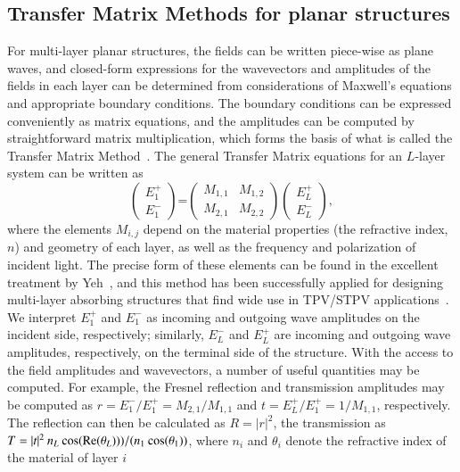 \documentclass[review]{elsarticle}
\begin{document}
\subsection{Transfer Matrix Methods for planar structures}
For multi-layer planar structures, the fields can be written piece-wise as plane waves, and closed-form expressions for the wavevectors
and amplitudes of the fields in each layer can be determined from considerations of Maxwell's equations and appropriate boundary
conditions.  The boundary conditions can be expressed conveniently as matrix equations, and the amplitudes can be computed by
straightforward matrix multiplication, which forms the basis of what is called the Transfer Matrix Method~\cite{Yeh}.  The general
Transfer Matrix equations for an $L$-layer system can be written as
\begin{equation}\label{Fresnel}
  \begin{pmatrix} E_1^+  \\ E_1^-  \end{pmatrix}
  \mbox{=}
  \begin{pmatrix}
  M_{1,1} & M_{1,2} \\
  M_{2,1} & M_{2,2}  \end{pmatrix}
  \begin{pmatrix} E_L^+ \\ E_L^-  \end{pmatrix},
\end{equation}
where the elements $M_{i,j}$ depend on the material properties (the refractive index, $n$) and geometry of each layer, as well as the
frequency and polarization of incident light.  The precise form of these elements can be found in the excellent treatment by Yeh~\cite{Yeh}, and this method 
has been successfully applied for designing multi-layer absorbing structures that find wide use in TPV/STPV applications~\cite{BN_JApplPhys_2005,LZ_JApplPhys_2006,FUS_OptExp_2015}.  We interpret $E_1^+$ and $E_1^-$
as incoming and outgoing wave amplitudes on the incident side, respectively; similarly, $E_L^-$ and $E_L^+$ are incoming and outgoing wave amplitudes, respectively,
on the terminal side of the structure.  With the access to the field amplitudes and wavevectors, a number of useful quantities may be computed.
For example, the Fresnel reflection and transmission amplitudes may be computed as $r =  E_1^-/E_1^+  =  M_{2,1}/M_{1,1}$  and
$t = E_L^+/E_1^+ =  1/M_{1,1}$, respectively.  The reflection can then be calculated as $R=|r|^2$, the transmission as
$T= |t|^2 \: n_L \: {\rm cos}({\rm Re}(\theta_L)))/(n_1 \: {\rm cos}(\theta_1))$, where $n_i$  and $\theta_i$ denote the refractive index of the material of layer $i$
\end{document}
